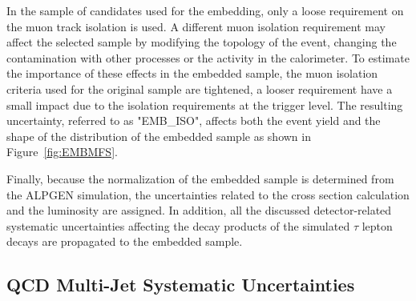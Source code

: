 In the sample of  \Zmumu candidates used for the embedding,  only a loose requirement on the  muon track isolation is used.
A different  muon isolation requirement may affect the selected sample by modifying the topology of the event, 
changing the contamination with other processes or the activity in the calorimeter. 
To estimate  the importance of these effects in the
embedded sample, the muon isolation criteria used for  the original \Zmumu sample are tightened,
a looser requirement have a  small impact due to the isolation requirements at the trigger level.
The resulting uncertainty, referred to as "EMB\_ISO", affects both the event yield and the shape of 
the \mmc  distribution of the embedded sample as shown in Figure~\ref{fig:EMBMFS}. 

Finally, because the normalization of the embedded sample is determined from the ALPGEN simulation, 
the uncertainties related to the cross section calculation and the luminosity are assigned. In addition,
all the discussed detector-related systematic uncertainties affecting the decay products of the simulated $\tau$ lepton 
decays are propagated to the embedded sample.

 

\subsection{QCD Multi-Jet Systematic Uncertainties}\label{sec:qcdsys}

